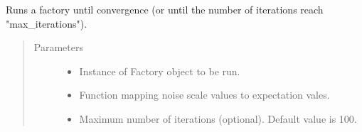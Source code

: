 \documentclass[letterpaper,10pt,english]{sphinxmanual}
\begin{document}
\begin{fulllineitems}
\label{\detokenize{apidoc:mitiq.zne.run_factory}}
Runs a factory until convergence (or until the number of iterations reach "max\_iterations").
\begin{quote}\begin{description}
\item[{Parameters}] \leavevmode\begin{itemize}
\item {} 
 \sphinxhyphen{}\sphinxhyphen{} Instance of Factory object to be run.

\item {} 
 \sphinxhyphen{}\sphinxhyphen{} Function mapping noise scale values to expectation vales.

\item {} 
 \sphinxhyphen{}\sphinxhyphen{} Maximum number of iterations (optional). Default value is 100.

\end{itemize}

\end{description}\end{quote}

\end{fulllineitems}

\end{document}
